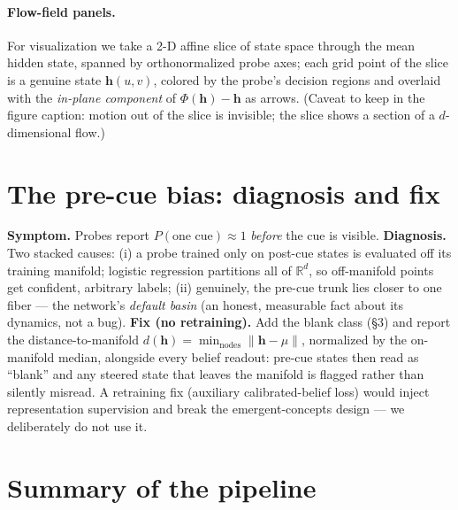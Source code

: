 \documentclass[11pt]{article}
\newcommand{\h}{\bm{h}}
\newcommand{\R}{\mathbb{R}}
\begin{document}
\paragraph{Flow-field panels.} For visualization we take a 2-D affine slice of
state space through the mean hidden state, spanned by orthonormalized probe
axes; each grid point of the slice is a genuine state $\h(u,v)$, colored by
the probe's decision regions and overlaid with the \emph{in-plane component} of
$\Phi(\h)-\h$ as arrows. (Caveat to keep in the figure caption: motion out of
the slice is invisible; the slice shows a section of a $d$-dimensional flow.)

\section{The pre-cue bias: diagnosis and fix}
\label{sec:precue}

\textbf{Symptom.} Probes report $P(\text{one cue}) \approx 1$ \emph{before}
the cue is visible. \textbf{Diagnosis.} Two stacked causes: (i) a probe
trained only on post-cue states is evaluated off its training manifold;
logistic regression partitions all of $\R^d$, so off-manifold points get
confident, arbitrary labels; (ii) genuinely, the pre-cue trunk lies closer to
one fiber --- the network's \emph{default basin} (an honest, measurable fact
about its dynamics, not a bug). \textbf{Fix (no retraining).} Add the blank
class (\S3) and report the distance-to-manifold
$d(\h) = \min_{\text{nodes}} \lVert \h - \mu \rVert$, normalized by the
on-manifold median, alongside every belief readout: pre-cue states then read
as ``blank'' and any steered state that leaves the manifold is flagged rather
than silently misread. A retraining fix (auxiliary calibrated-belief loss)
would inject representation supervision and break the emergent-concepts design
--- we deliberately do not use it.

\section{Summary of the pipeline}
\end{document}
